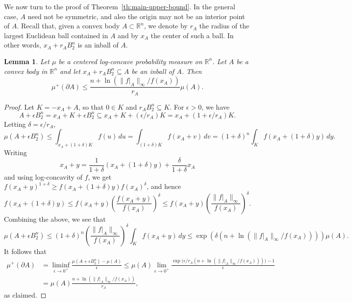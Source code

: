 \documentclass[11pt,leqno]{article}
\newtheorem{lemma}[theorem]{Lemma}
\theoremstyle{remark}
\numberwithin{equation}{section}
\newcommand{\ls}{\leqslant}
\newcommand{\gr}{\geqslant}
\begin{document}
\smallskip 

We now turn to the proof of Theorem~\ref{th:main-upper-bound}. 
In the general case, $A$ need not be symmetric, and also the origin may not be an interior point of $A$. Recall that, given a convex body 
$A \subset \mathbb{R}^n$, we denote by $r_A$ the radius of the largest Euclidean ball contained in $A$ and by $x_A$ the center of such a ball. 
In other words, $x_A+r_AB_2^n$ is an inball of $A$.

\begin{lemma}\label{lem:center-general-1}Let $\mu$ be a centered log-concave probability measure on $\mathbb{R}^n$. Let $A$ be a convex body in $\mathbb{R}^n$
and let $x_A+r_AB_2^n\subseteq A$ be an inball of $A$. Then
$$\mu^+(\partial A)\ls \frac{n+\ln(\|f\big|_A\|_{\infty}/f(x_A))}{r_A}\mu(A).$$
\end{lemma}

\begin{proof}Let $K=-x_A+A$, so that $0\in K$ and $r_AB_2^n\subseteq K$. For $\epsilon>0$, we have
$$A+\epsilon B_2^n=x_A+K+\epsilon B_2^n\subseteq x_A+K+(\epsilon /r_A)K=x_A+(1+\epsilon /r_A)K.$$
Letting $\delta =\epsilon /r_A$,
$$\mu(A+\epsilon B_2^n)\ls \int_{x_A+(1+\delta)K}f(u)\,du=\int_{(1+\delta)K}f(x_A+v)\,dv=(1+\delta)^n\int_Kf(x_A+(1+\delta)y)\,dy.$$ 
Writing
$$x_A+y=\frac{1}{1+\delta}(x_A+(1+\delta)y)+\frac{\delta}{1+\delta}x_A$$
and using log-concavity of $f$, we get $f(x_A+y)^{1+\delta}\gr f(x_A+(1+\delta)y)f(x_A)^{\delta}$, and hence
\begin{equation}\label{eq:important}f(x_A+(1+\delta)y)\ls f(x_A+y)\left(\frac{f(x_A+y)}{f(x_A)}\right)^{\delta}
\ls f(x_A+y)\left(\frac{\|f\big|_A\|_{\infty}}{f(x_A)}\right)^{\delta}.\end{equation}
Combining the above, we see that
$$\mu(A+\epsilon B_2^n)\ls (1+\delta)^n\left(\frac{\|f\big|_A\|_{\infty}}{f(x_A)}\right)^{\delta}\int_Kf(x_A+y)\,dy
\ls \exp\left(\delta\left(n+\ln\left(\|f\big|_A\|_{\infty}/f(x_A)\right)\right)\right)\mu(A).$$
It follows that
\begin{align*}\mu^+(\partial A) 
&=\liminf_{\epsilon\to 0^+}\frac{\mu(A+\epsilon B_2^n)-\mu(A)}{\epsilon }
\ls \mu(A)\lim_{\epsilon\to 0^+}
\frac{\exp\big(\epsilon /r_A(n+\ln(\|f\big|_A\|_{\infty}/f(x_A)))\big)-1}{\epsilon }\\
&=\mu(A)\frac{n+\ln(\|f\big|_A\|_{\infty}/f(x_A))}{r_A},
\end{align*}
as claimed. \end{proof} 
\end{document}
